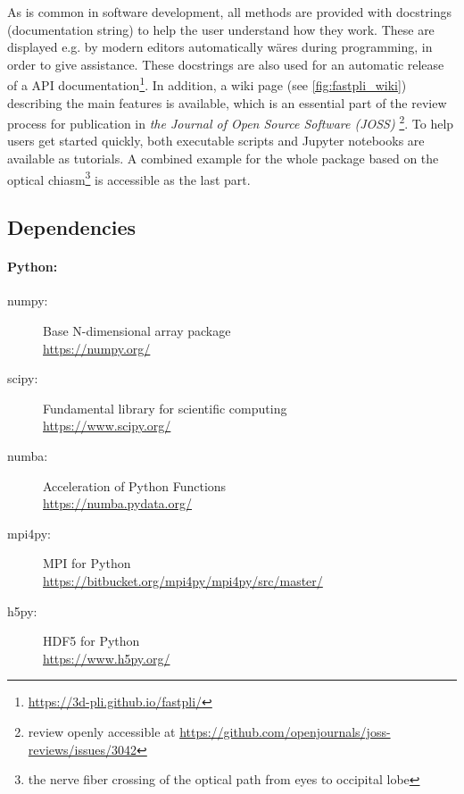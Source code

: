 % 
As is common in software development, all methods are provided with docstrings (documentation string) to help the user understand how they work.
These are displayed e.g. by modern editors automatically wäres during programming, in order to give assistance.
These docstrings are also used for an automatic release of a \ac{API} documentation\footnote{\url{https://3d-pli.github.io/fastpli/}}.
In addition, a wiki page (see \cref{fig:fastpli_wiki}) describing the main features is available, which is an essential part of the review process for publication in \textit{the Journal of Open Source Software (JOSS)} \cite{Matuschke2021} \footnote{review openly accessible at \url{https://github.com/openjournals/joss-reviews/issues/3042}}.
To help users get started quickly, both executable \python{} scripts and Jupyter notebooks are available as tutorials.
A combined example for the whole package based on the optical chiasm\footnote{the nerve fiber crossing of the optical path from eyes to occipital lobe} is accessible as the last part.
% 
% 
% 
\subsection{Dependencies}
% 
\paragraph{Python:}
\begin{description}
\item[numpy:] Base N-dimensional array package \cite{2019arXiv190710121V}\\
\url{https://numpy.org/}
\item[scipy:] Fundamental library for scientific computing \cite{2019arXiv190710121V}\\
\url{https://www.scipy.org/} 
\item[numba:] Acceleration of Python Functions \cite{Lam2015}\\
\url{https://numba.pydata.org/}
\item[mpi4py:] MPI for Python \cite{Dalcn2005, Dalcn2008, Dalcin2011}\\
\url{https://bitbucket.org/mpi4py/mpi4py/src/master/}
\item[h5py:] HDF5 for Python \cite{collette_python_hdf5_2014, hdf5}\\
\url{https://www.h5py.org/}
\end{description}
% 
